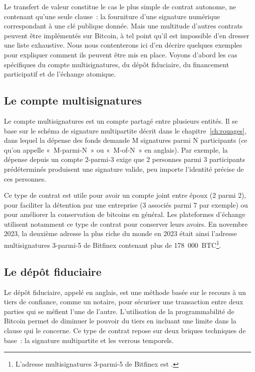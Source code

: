 Le transfert de valeur constitue le cas le plus simple de contrat autonome, ne contenant qu'une seule clause~: la fourniture d'une signature numérique correspondant à une clé publique donnée. Mais une multitude d'autres contrats peuvent être implémentés sur Bitcoin, à tel point qu'il est impossible d'en dresser une liste exhaustive. Nous nous contenterons ici d'en décrire quelques exemples pour expliquer comment ils peuvent être mis en place. Voyons d'abord les cas spécifiques du compte multisignatures, du dépôt fiduciaire, du financement participatif et de l'échange atomique.


\subsection{Le compte multisignatures} Le compte multisignatures est un compte partagé entre plusieurs entités. Il se base sur le schéma de signature multipartite décrit dans le chapitre~\ref{ch:rouages}, dans lequel la dépense des fonds demande M signatures parmi N participants (ce qu'on appelle «~M-parmi-N~» ou «~M-of-N~» en anglais). Par exemple, la dépense depuis un compte 2-parmi-3 exige que 2 personnes parmi 3 participants prédéterminés produisent une signature valide, peu importe l'identité précise de ces personnes.

Ce type de contrat est utile pour avoir un compte joint entre époux (2 parmi 2), pour faciliter la détention par une entreprise (3 associés parmi 7 par exemple) ou pour améliorer la conservation de bitcoins en général. Les plateformes d'échange utilisent notamment ce type de contrat pour conserver leurs avoirs. En novembre 2023, la deuxième adresse la plus riche du monde en 2023 était ainsi l'adresse multisignatures 3-parmi-5 de Bitfinex contenant plus de 178~000~BTC\footnote{L'adresse multisignatures 3-parmi-5 de Bitfinex est .}.


\subsection{Le dépôt fiduciaire} Le dépôt fiduciaire, appelé  en anglais, est une méthode basée sur le recours à un tiers de confiance, comme un notaire, pour sécuriser une transaction entre deux parties qui se méfient l'une de l'autre. L'utilisation de la programmabilité de Bitcoin permet de diminuer le pouvoir du tiers en incluant une limite dans la clause qui le concerne. Ce type de contrat repose sur deux briques techniques de base~: la signature multipartite et les verrous temporels.


